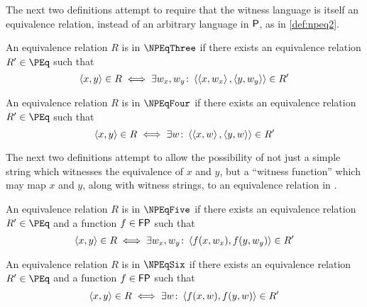 The next two definitions attempt to require that the witness language is itself an equivalence relation, instead of an arbitrary language in $\P$, as in \autoref{def:npeq2}.
\begin{definition}\label{def:npeq3}
  An equivalence relation $R$ is in $\NPEqThree$ if there exists an equivalence relation $R'\in \PEq$ such that
  \begin{displaymath}
    \pair{x}{y}\in R\iff \exists w_x,w_y\colon \pair{\pair{x}{w_x}}{\pair{y}{w_y}}\in R'
  \end{displaymath}
\end{definition}
\begin{definition}\label{def:npeq4}
  An equivalence relation $R$ is in $\NPEqFour$ if there exists an equivalence relation $R'\in \PEq$ such that
  \begin{displaymath}
    \pair{x}{y}\in R\iff \exists w\colon \pair{\pair{x}{w}}{\pair{y}{w}}\in R'
  \end{displaymath}
\end{definition}

The next two definitions attempt to allow the possibility of not just a simple string which witnesses the equivalence of $x$ and $y$, but a ``witness function'' which may map $x$ and $y$, along with witness strings, to an equivalence relation in \PEq.
\begin{definition}\label{def:npeq5}
  An equivalence relation $R$ is in $\NPEqFive$ if there exists an equivalence relation $R'\in \PEq$ and a function $f\in\FP$ such that
  \begin{displaymath}
    \pair{x}{y}\in R\iff \exists w_x,w_y\colon \pair{f(x, w_x)}{f(y, w_y)}\in R'
  \end{displaymath}
\end{definition}
\begin{definition}\label{def:npeq6}
  An equivalence relation $R$ is in $\NPEqSix$ if there exists an equivalence relation $R'\in \PEq$ and a function $f\in\FP$ such that
  \begin{displaymath}
    \pair{x}{y}\in R\iff \exists w\colon \pair{f(x, w)}{f(y, w)}\in R'
  \end{displaymath}
\end{definition}

